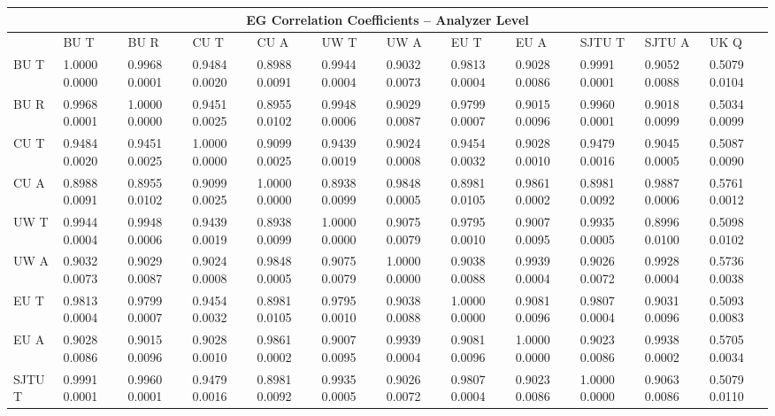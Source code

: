 \begin{landscape}
\begin{table}
\small
\centering
\renewcommand{\arraystretch}{1.5}
\begin{tabularx}{1\linewidth}{@{\extracolsep{\fill}}lXXXXXXXXXXX}
  \toprule
  	\multicolumn{12}{c}{{\normalsize EG Correlation Coefficients -- Analyzer Level}} \\
  \midrule
  	       & BU T & BU R & CU T & CU A & UW T & UW A & EU T & EU A & SJTU T & SJTU A & UK Q \\
  \midrule
	BU T   & 1.0000 0.0000 & 0.9968 0.0001 & 0.9484 0.0020 & 0.8988 0.0091 & 0.9944 0.0004 & 0.9032 0.0073 & 0.9813 0.0004 & 0.9028 0.0086 & 0.9991 0.0001 & 0.9052 0.0088 & 0.5079 0.0104  \\
	BU R   & 0.9968 0.0001 & 1.0000 0.0000 & 0.9451 0.0025 & 0.8955 0.0102 & 0.9948 0.0006 & 0.9029 0.0087 & 0.9799 0.0007 & 0.9015 0.0096 & 0.9960 0.0001 & 0.9018 0.0099 & 0.5034 0.0099  \\
	CU T   & 0.9484 0.0020 & 0.9451 0.0025 & 1.0000 0.0000 & 0.9099 0.0025 & 0.9439 0.0019 & 0.9024 0.0008 & 0.9454 0.0032 & 0.9028 0.0010 & 0.9479 0.0016 & 0.9045 0.0005 & 0.5087 0.0090  \\
	CU A   & 0.8988 0.0091 & 0.8955 0.0102 & 0.9099 0.0025 & 1.0000 0.0000 & 0.8938 0.0099 & 0.9848 0.0005 & 0.8981 0.0105 & 0.9861 0.0002 & 0.8981 0.0092 & 0.9887 0.0006 & 0.5761 0.0012  \\
	UW T   & 0.9944 0.0004 & 0.9948 0.0006 & 0.9439 0.0019 & 0.8938 0.0099 & 1.0000 0.0000 & 0.9075 0.0079 & 0.9795 0.0010 & 0.9007 0.0095 & 0.9935 0.0005 & 0.8996 0.0100 & 0.5098 0.0102  \\
	UW A   & 0.9032 0.0073 & 0.9029 0.0087 & 0.9024 0.0008 & 0.9848 0.0005 & 0.9075 0.0079 & 1.0000 0.0000 & 0.9038 0.0088 & 0.9939 0.0004 & 0.9026 0.0072 & 0.9928 0.0004 & 0.5736 0.0038  \\
	EU T   & 0.9813 0.0004 & 0.9799 0.0007 & 0.9454 0.0032 & 0.8981 0.0105 & 0.9795 0.0010 & 0.9038 0.0088 & 1.0000 0.0000 & 0.9081 0.0096 & 0.9807 0.0004 & 0.9031 0.0096 & 0.5093 0.0083  \\
	EU A   & 0.9028 0.0086 & 0.9015 0.0096 & 0.9028 0.0010 & 0.9861 0.0002 & 0.9007 0.0095 & 0.9939 0.0004 & 0.9081 0.0096 & 1.0000 0.0000 & 0.9023 0.0086 & 0.9938 0.0002 & 0.5705 0.0034  \\
	SJTU T & 0.9991 0.0001 & 0.9960 0.0001 & 0.9479 0.0016 & 0.8981 0.0092 & 0.9935 0.0005 & 0.9026 0.0072 & 0.9807 0.0004 & 0.9023 0.0086 & 1.0000 0.0000 & 0.9063 0.0086 & 0.5079 0.0110  \\

\end{tabularx}
\end{table}
\end{landscape}
